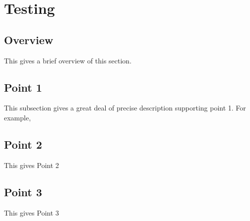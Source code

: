 \section{Testing}																	
\label{sec:Testing}

\subsection{Overview} 
This gives a brief overview of this section.

\subsection{Point 1}
This subsection gives a great deal of precise description supporting point 1.  For example,

\subsection{Point 2}
This gives Point 2

\subsection{Point 3}
This gives Point 3
